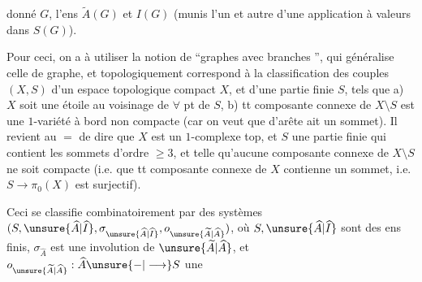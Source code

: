 donné $G$, l'ens $\widetilde A(G)$ et $I(G)$ (munis l'un et autre d'une application  à valeurs dans $S(G)$).

Pour ceci, on a à utiliser la notion de ``graphes avec branches '', qui généralise celle de graphe, et topologiquement correspond à la classification des  couples $(X,S)$ d'un espace topologique compact $X$, et d'une partie finie $S$, tels que a) $X$ soit une étoile au voisinage de $\forall$ pt de $S$,  b)  tt composante connexe de $X\setminus S$ est une $1$-variété à bord non compacte (car on veut que   d'arête ait un sommet). Il revient au $=$ de dire que $X$ est un $1$-complexe top, et $S$ une partie finie qui contient les sommets d'ordre $\geq3$, et telle qu'aucune composante connexe de $X\setminus S$ ne soit compacte (i.e. que tt composante connexe de $X$ contienne un sommet, i.e. $S\longrightarrow\pi_0(X)$ est surjectif).

Ceci se classifie combinatoirement par des systèmes $(S,\unsure{\widehat A|\widehat I},\sigma_{\unsure{\widehat A|\widehat I}},o_{\unsure{\widetilde A|\widehat A}})$, où  $S,\unsure{\widehat A|\widehat I}$ sont des ens finis, $\sigma_{\widehat A}$ est une involution de $\unsure{\widetilde A|\widehat A}$, et $o_{\unsure{\widetilde A|\widehat A}}:\widehat A\unsure{-|\longrightarrow}S$ une
